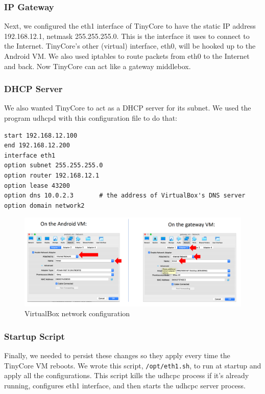 \documentclass[a4paper, 11pt]{article} %
\begin{document}
\subsubsection{IP Gateway}

Next, we configured the eth1 interface of TinyCore to have the static IP address
192.168.12.1, netmask 255.255.255.0. This is the interface it uses to connect to
the Internet. TinyCore's other (virtual) interface, eth0, will be hooked up to
the Android VM. We also used iptables to route packets from eth0 to the Internet
and back. Now TinyCore can act like a gateway middlebox.

\subsubsection{DHCP Server}

We also wanted TinyCore to act as a DHCP server for its subnet. We used the
program udhcpd with this configuration file to do that:

\begin{lstlisting}
start 192.168.12.100
end 192.168.12.200
interface eth1
option subnet 255.255.255.0
option router 192.168.12.1
option lease 43200
option dns 10.0.2.3       # the address of VirtualBox's DNS server
option domain network2
\end{lstlisting}

\begin{figure}[h]
	\centering
	\includegraphics[width=\textwidth]{virtualbox-config.png}
	\caption{VirtualBox network configuration}
\end{figure}

\subsubsection{Startup Script}

Finally, we needed to persist these changes so they apply every time the
TinyCore VM reboots. We wrote this script, \texttt{/opt/eth1.sh}, to run at
startup and apply all the configurations. This script kills the udhcpc process
if it's already running, configures eth1 interface, and then starts the udhcpc
server process.
\end{document}
